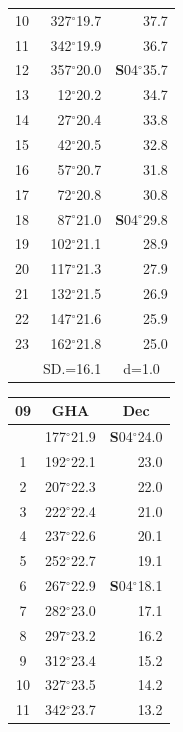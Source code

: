 \documentclass[10pt, a4paper]{report}
\begin{document}
\begin{scriptsize}
\begin{tabular*}{0.2\textwidth}[t]{@{\extracolsep{\fill}}|c|rr|}
10 & 327$^\circ$19.7 & 37.7\\
11 & 342$^\circ$19.9 & 36.7\\[2Pt]
12 & 357$^\circ$20.0 & \textbf{S}04$^\circ$35.7\\
13 & 12$^\circ$20.2 & 34.7\\
14 & 27$^\circ$20.4 & 33.8\\
15 & 42$^\circ$20.5 & \raisebox{0.24ex}{\boldmath$\cdot$~\boldmath$\cdot$~~}32.8\\
16 & 57$^\circ$20.7 & 31.8\\
17 & 72$^\circ$20.8 & 30.8\\[2Pt]
18 & 87$^\circ$21.0 & \textbf{S}04$^\circ$29.8\\
19 & 102$^\circ$21.1 & 28.9\\
20 & 117$^\circ$21.3 & 27.9\\
21 & 132$^\circ$21.5 & \raisebox{0.24ex}{\boldmath$\cdot$~\boldmath$\cdot$~~}26.9\\
22 & 147$^\circ$21.6 & 25.9\\
23 & 162$^\circ$21.8 & 25.0\\
\hline
\rule{0pt}{2.4ex} & \multicolumn{1}{c}{SD.=16.1} & \multicolumn{1}{c|}{d=1.0}\\
\hline
\end{tabular*}\noindent
\begin{tabular*}{0.2\textwidth}[t]{@{\extracolsep{\fill}}|c|rr|}
\hline
\multicolumn{1}{|c|}{\rule{0pt}{2.6ex}\textbf{09}} & \multicolumn{1}{c}{\textbf{GHA}} & \multicolumn{1}{c|}{\textbf{Dec}}\\
\hline\rule{0pt}{2.6ex}\noindent
0 & 177$^\circ$21.9 & \textbf{S}04$^\circ$24.0\\
1 & 192$^\circ$22.1 & 23.0\\
2 & 207$^\circ$22.3 & 22.0\\
3 & 222$^\circ$22.4 & \raisebox{0.24ex}{\boldmath$\cdot$~\boldmath$\cdot$~~}21.0\\
4 & 237$^\circ$22.6 & 20.1\\
5 & 252$^\circ$22.7 & 19.1\\[2Pt]
6 & 267$^\circ$22.9 & \textbf{S}04$^\circ$18.1\\
7 & 282$^\circ$23.0 & 17.1\\
8 & 297$^\circ$23.2 & 16.2\\
9 & 312$^\circ$23.4 & \raisebox{0.24ex}{\boldmath$\cdot$~\boldmath$\cdot$~~}15.2\\
10 & 327$^\circ$23.5 & 14.2\\
11 & 342$^\circ$23.7 & 13.2\\[2Pt]

\end{tabular*}
\end{scriptsize}
\end{document}
